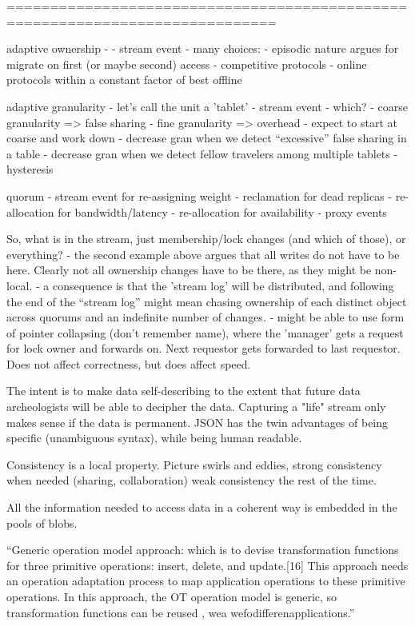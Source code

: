 =============================================================================

adaptive ownership - 
- stream event
- many choices:
  - episodic nature argues for migrate on first (or maybe second) access
  - competitive protocols - online protocols within a constant factor
    of best offline

adaptive granularity - let's call the unit a 'tablet'
- stream event
- which?
  - coarse granularity => false sharing
  - fine granularity => overhead
- expect to start at coarse and work down
  - decrease gran when we detect ``excessive'' false sharing in a table
  - decrease gran when we detect fellow travelers among multiple tablets
  - hysteresis

quorum 
- stream event for re-assigning weight
  - reclamation for dead replicas
  - re-allocation for bandwidth/latency
  - re-allocation for availability
  - proxy events

So, what is in the stream, just membership/lock changes (and which of
those), or everything?
- the second example above argues that all writes do not have to be
  here. Clearly not all ownership changes have to be there, as they
  might be non-local. 
- a consequence is that the 'stream log' will be distributed, and
  following the end of the ``stream log'' might mean chasing ownership
  of each distinct object across quorums and an indefinite number of
  changes.
- might be able to use form of pointer collapsing (don't remember
  name), where the 'manager' gets a request for lock owner and
  forwards on. Next requestor gets forwarded to last requestor. Does
  not affect correctness, but does affect speed.

The intent is to make data self-describing to the extent that future data
archeologists will be able to decipher the data. Capturing a "life" stream
only makes sense if the data is permanent. JSON has the twin
advantages of being specific (unambiguous syntax), while being
human readable.

Consistency is a local property. Picture swirls and eddies, strong 
consistency when needed (sharing, collaboration) weak consistency
the rest of the time.

All the information needed to access data in a coherent way is embedded
in the pools of blobs.



``Generic operation model approach: which is to devise transformation functions for three primitive operations: insert, delete, and update.[16] This approach needs an operation adaptation process to map application operations to these primitive operations. In this approach, the OT operation model is generic, so transformation functions can be reused , wea wefodifferenapplications.''
